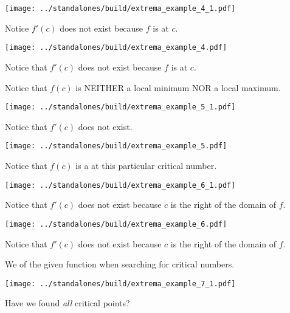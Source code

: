 \documentclass[12pt]{beamer}
\begin{document}
\begin{frame}[t]
  \texttt{[image: ../standalones/build/extrema\_example\_4\_1.pdf]}

  Notice \(f'(c)\) does not exist because \(f\) is  at \(c\). 
\end{frame}

\begin{frame}[t]
  \texttt{[image: ../standalones/build/extrema\_example\_4.pdf]}
  
  Notice that \(f'(c)\) does not exist because \(f\) is  at \(c\). 
  \pause 

  Notice that \(f(c)\) is NEITHER a local minimum NOR a local maximum.
\end{frame}


\begin{frame}[t]
  \texttt{[image: ../standalones/build/extrema\_example\_5\_1.pdf]}

  Notice that \(f'(c)\) does not exist.
\end{frame}

\begin{frame}[t]
  \texttt{[image: ../standalones/build/extrema\_example\_5.pdf]}
  
  \pause 
  Notice that \(f(c)\) is a  at this particular critical number.
\end{frame}


\begin{frame}[t]
  \texttt{[image: ../standalones/build/extrema\_example\_6\_1.pdf]}

  Notice that \(f'(c)\) does not exist because \(c\) is the right  of the domain of \(f\).
\end{frame}

\begin{frame}[t]
  \texttt{[image: ../standalones/build/extrema\_example\_6.pdf]}
  
  Notice that \(f'(c)\) does not exist because \(c\) is the right  of the domain of \(f\).

  \pause        
  \hlwarn{\faExclamationTriangle{}} We  of the given function when searching for critical numbers.
\end{frame}



\begin{frame}[t]
  \texttt{[image: ../standalones/build/extrema\_example\_7\_1.pdf]}
  
  \faComment{} Have we found \emph{all} critical points?
\end{frame}
\end{document}
